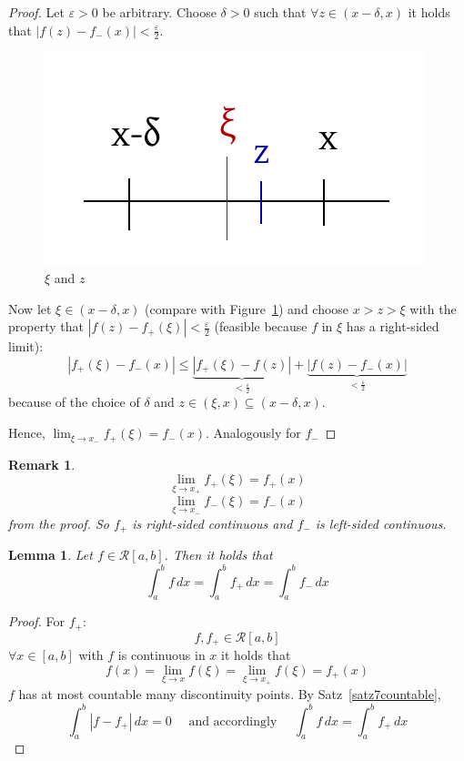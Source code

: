 \documentclass{article}
\newtheorem{lemma}{Lemma}  \numberwithin{lemma}{section}
\newtheorem{remark}{Remark}  \numberwithin{remark}{section}
\newcommand{\card}[1]{\left|#1\right|}
\begin{document}
\begin{proof}
  Let $\varepsilon > 0$ be arbitrary. Choose $\delta > 0$ such that $\forall z \in (x - \delta, x)$ it holds that $\card{f(z) - f_-(x)} < \frac\varepsilon2$.

  \begin{figure}[t]
    \begin{center}
      \includegraphics{img/21_xi_z.pdf}
      \caption{$\xi$ and $z$}
      \label{img:xiz}
    \end{center}
  \end{figure}

  Now let $\xi \in (x - \delta, x)$ (compare with Figure~\ref{img:xiz}) and choose $x > z > \xi$ with the property that $\card{f(z) - f_+(\xi)} < \frac\varepsilon2$ (feasible because $f$ in $\xi$ has a right-sided limit):
  \[
    \card{f_+(\xi) - f_-(x)}
    \leq \underbrace{\card{f_+(\xi) - f(z)}}_{< \frac\varepsilon2} + \underbrace{\card{f(z) - f_-(x)}}_{< \frac\varepsilon2}
  \]
  because of the choice of $\delta$ and $z \in (\xi, x) \subseteq (x - \delta, x)$.

  Hence, $\lim_{\xi \to x_-} f_+(\xi) = f_-(x)$. Analogously for $f_-$
\end{proof}

\begin{remark}
  \[ \lim_{\xi \to x_+} f_+(\xi) = f_+(x) \]
  \[ \lim_{\xi \to x_-} f_-(\xi) = f_-(x) \]
  from the proof. So $f_+$ is right-sided continuous and $f_-$ is left-sided continuous.
\end{remark}

\begin{lemma} %
  Let $f \in \mathcal R[a,b]$. Then it holds that
  \[ \int_a^b f \, dx = \int_a^b f_+ \, dx = \int_a^b f_- \, dx \]
\end{lemma}

\begin{proof}
  For $f_+$:
  \[ f, f_+ \in \mathcal R[a,b] \]
  $\forall x \in [a,b]$ with $f$ is continuous in $x$ it holds that
  \[ f(x) = \lim_{\xi\to x} f(\xi) = \lim_{\xi\to x_+} f(\xi) = f_+(x) \]
  $f$ has at most countable many discontinuity points. By Satz~\ref{satz7countable},
  \[
    \int_a^b \card{f - f_+} \, dx = 0
    \quad \text{ and accordingly } \quad
    \int_a^b f \, dx = \int_a^b f_+ \, dx
  \]
\end{proof}
\end{document}
